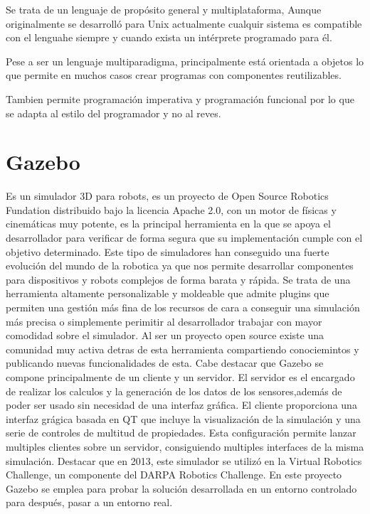 Se trata de un lenguaje de propósito general y multiplataforma, Aunque originalmente se desarrolló para Unix actualmente cualquir sistema es compatible con el lenguahe siempre y cuando exista un intérprete programado para él.

Pese a ser un lenguaje multiparadigma, principalmente está orientada a objetos lo que permite en muchos casos crear programas con componentes reutilizables. 

Tambien permite programación imperativa y programación funcional por lo que se adapta al estilo del programador y no al reves.

\section{Gazebo}
\label{sec:gazebo}
Es un simulador 3D para robots, es un proyecto de Open Source Robotics Fundation distribuido bajo la licencia Apache 2.0, con un motor de físicas y cinemáticas muy potente, es la principal herramienta en la que se apoya el desarrollador para verificar de forma segura que su implementación cumple con el objetivo determinado. Este tipo de simuladores han conseguido una fuerte evolución del mundo de la robotica ya que nos permite desarrollar componentes para dispositivos y robots complejos de forma barata y rápida.
Se trata de una herramienta altamente personalizable y moldeable que admite plugins que permiten una gestión más fina de los recursos de cara a conseguir una simulación más precisa o simplemente perimitir al desarrollador trabajar con mayor comodidad sobre el simulador.
Al ser un proyecto open source existe una comunidad muy activa detras de esta herramienta compartiendo conociemintos y publicando nuevas funcionalidades de esta.
Cabe destacar que Gazebo se compone principalmente de un cliente y un servidor. El
servidor es el encargado de realizar los calculos y la generación de los datos de los sensores,además de poder ser usado sin necesidad de una interfaz gráfica.
El cliente proporciona una interfaz grágica basada en QT que incluye la visualización de la simulación y una serie de controles de multitud de propiedades. Esta configuración permite lanzar multiples clientes sobre un servidor, consiguiendo multiples interfaces de la misma simulación.
Destacar que en 2013, este simulador se utilizó en la Virtual Robotics Challenge, un componente del DARPA Robotics Challenge.
En este proyecto Gazebo se emplea para probar la solución desarrollada en un entorno controlado para después, pasar a un entorno real.